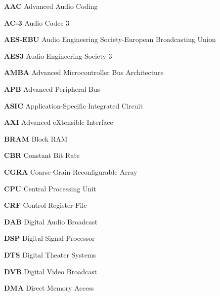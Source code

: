 \begin{description}
    \item \hspace{2mm} \textbf{AAC} Advanced Audio Coding
    \item \hspace{2mm} \textbf{AC-3} Audio Codec 3
    \item \hspace{2mm} \textbf{AES-EBU} Audio Engineering Society-European Broadcasting Union
    \item \hspace{2mm} \textbf{AES3} Audio Engineering Society 3
    \item \hspace{2mm} \textbf{AMBA} Advanced Microcontroller Bus Architecture
    \item \hspace{2mm} \textbf{APB} Advanced Peripheral Bus
    \item \hspace{2mm} \textbf{ASIC} Application-Specific Integrated Circuit
    \item \hspace{2mm} \textbf{AXI} Advanced eXtensible Interface
    \item \hspace{2mm} \textbf{BRAM} Block RAM
    \item \hspace{2mm} \textbf{CBR} Constant Bit Rate
    \item \hspace{2mm} \textbf{CGRA} Coarse-Grain Reconfigurable Array
    \item \hspace{2mm} \textbf{CPU} Central Processing Unit
    \item \hspace{2mm} \textbf{CRF} Control Register File
    \item \hspace{2mm} \textbf{DAB} Digital Audio Broadcast
    \item \hspace{2mm} \textbf{DSP} Digital Signal Processor
    \item \hspace{2mm} \textbf{DTS} Digital Theater Systems
    \item \hspace{2mm} \textbf{DVB} Digital Video Broadcast
    \item \hspace{2mm} \textbf{DMA} Direct Memory Access

\end{description}
